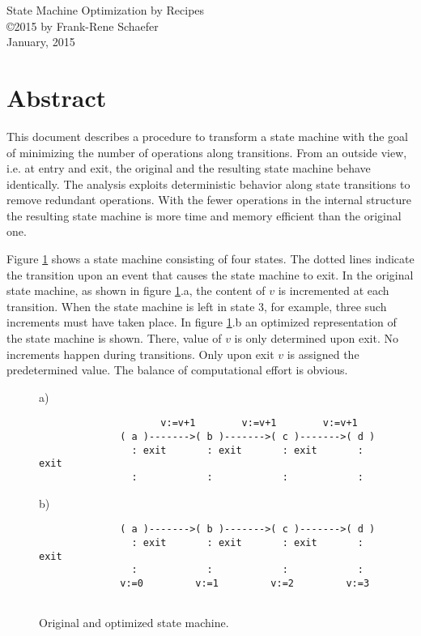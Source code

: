 \documentclass[12pt,a4paper]{scrartcl}
\begin{document}
\begin{center}
{\large State Machine Optimization by Recipes} \\ 
\copyright 2015 by Frank-Rene Schaefer         \\
January, 2015
\end{center}


%
\section{Abstract}

This document describes a procedure to transform a state machine with the goal
of minimizing the number of operations along transitions.  From an outside
view, i.e. at entry and exit, the original and the resulting state machine
behave identically.  The analysis exploits deterministic behavior along state
transitions to remove redundant operations.  With the fewer operations in the
internal structure the resulting state machine is more time and memory efficient
than the original one.  

Figure \ref{fig:two-state-machines} shows a state machine consisting of four
states.  The dotted lines indicate the transition upon an event that causes the
state machine to exit.  In the original state machine, as shown in figure
\ref{fig:two-state-machines}.a, the content of $v$ is incremented at each
transition. When the state machine is left in state 3, for example, three such
increments must have taken place. In figure \ref{fig:two-state-machines}.b an
optimized representation of the state machine is shown.  There, value of $v$ is
only determined upon exit.  No increments happen during transitions. Only upon
exit $v$ is assigned the predetermined value. The balance of computational
effort is obvious.

\begin{figure}[htbp] \leavevmode \label{fig:two-state-machines}
a)
\begin{verbatim}
                     v:=v+1        v:=v+1        v:=v+1
              ( a )------->( b )------->( c )------->( d )
                : exit       : exit       : exit       : exit
                :            :            :            :
\end{verbatim}
    
b)
\begin{verbatim}
              ( a )------->( b )------->( c )------->( d )
                : exit       : exit       : exit       : exit
                :            :            :            :
              v:=0         v:=1         v:=2         v:=3
    
\end{verbatim}
\caption{Original and optimized state machine.}
\end{figure}
                 
\end{document}
